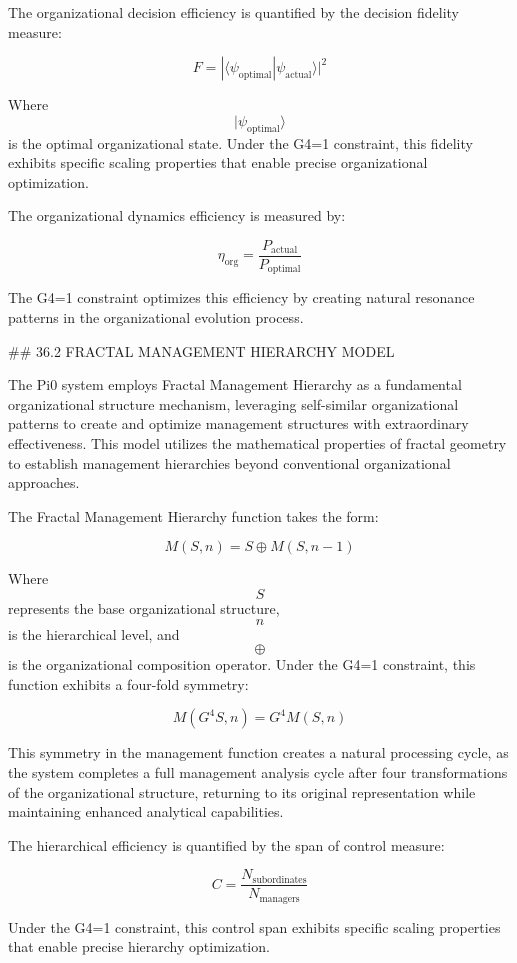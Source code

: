 The organizational decision efficiency is quantified by the decision fidelity measure:

$$ F = |\langle \psi_{\text{optimal}} | \psi_{\text{actual}} \rangle|^2 $$

Where $$ |\psi_{\text{optimal}}\rangle $$ is the optimal organizational state. Under the G4=1 constraint, this fidelity exhibits specific scaling properties that enable precise organizational optimization.

The organizational dynamics efficiency is measured by:

$$ \eta_{\text{org}} = \frac{P_{\text{actual}}}{P_{\text{optimal}}} $$

The G4=1 constraint optimizes this efficiency by creating natural resonance patterns in the organizational evolution process.

## 36.2 FRACTAL MANAGEMENT HIERARCHY MODEL

The Pi0 system employs Fractal Management Hierarchy as a fundamental organizational structure mechanism, leveraging self-similar organizational patterns to create and optimize management structures with extraordinary effectiveness. This model utilizes the mathematical properties of fractal geometry to establish management hierarchies beyond conventional organizational approaches.

The Fractal Management Hierarchy function takes the form:

$$ M(S, n) = S \oplus M(S, n-1) $$

Where $$ S $$ represents the base organizational structure, $$ n $$ is the hierarchical level, and $$ \oplus $$ is the organizational composition operator. Under the G4=1 constraint, this function exhibits a four-fold symmetry:

$$ M(G^4 S, n) = G^4 M(S, n) $$

This symmetry in the management function creates a natural processing cycle, as the system completes a full management analysis cycle after four transformations of the organizational structure, returning to its original representation while maintaining enhanced analytical capabilities.

The hierarchical efficiency is quantified by the span of control measure:

$$ C = \frac{N_{\text{subordinates}}}{N_{\text{managers}}} $$

Under the G4=1 constraint, this control span exhibits specific scaling properties that enable precise hierarchy optimization.

